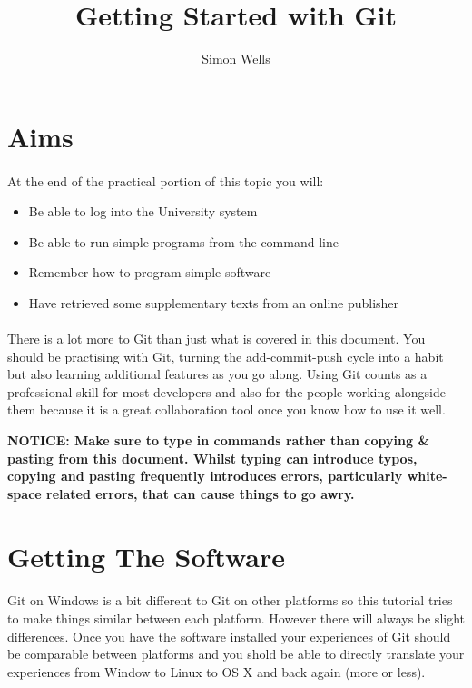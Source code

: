 \documentclass[10pt, a4paper]{article}
\title{Getting Started with Git}
\author{Simon Wells}
\date{}
\begin{document}
\maketitle

\section{Aims}
\paragraph{} At the end of the practical portion of this topic you will:

\begin{itemize}
\item Be able to log into the University system
\item Be able to run simple programs from the command line
\item Remember how to program simple software
\item Have retrieved some supplementary texts from an online publisher
\end{itemize}

\paragraph{} There is a lot more to Git than just what is covered in this document. You should be practising with Git, turning the add-commit-push cycle into a habit but also learning additional features as you go along. Using Git counts as a professional skill for most developers and also for the people working alongside them because it is a great collaboration tool once you know how to use it well.

\begin{framed}
{\bf{NOTICE:} Make sure to type in commands rather than copying \& pasting from this document. Whilst typing can introduce typos, copying and pasting frequently introduces errors, particularly white-space related errors, that can cause things to go awry.}
\end{framed}

\section{Getting The Software}
\paragraph{} Git on Windows is a bit different to Git on other platforms so this tutorial tries to make things similar between each platform. However there will always be slight differences. Once you have the software installed your experiences of Git should be comparable between platforms and you shold be able to directly translate your experiences from Window to Linux to OS X and back again (more or less).
\end{document}
